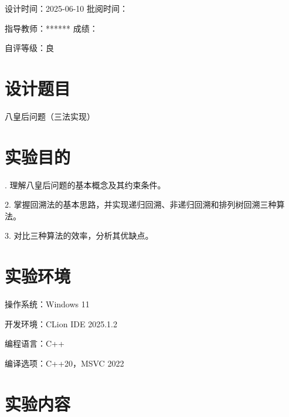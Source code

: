 \documentclass[12pt, a4paper, oneside]{ctexart}
\begin{document}
\begin{flushleft}
\vspace{1em}
\songti\fontsize{18pt}{18pt}\selectfont 设计时间：2025-06-10 \hspace{4em}批阅时间：

\vspace{1em}
\songti\fontsize{18pt}{18pt}\selectfont 指导教师：****** \hspace{7em} 成绩：

\vspace{1em}
\songti\fontsize{18pt}{18pt}\selectfont 自评等级：良
\end{flushleft}

\newpage %

\clearpage
\tableofcontents
\clearpage

\newpage %


\section{设计题目}
\begin{flushleft}
\songti\fontsize{16pt}{16pt}\selectfont
八皇后问题（三法实现）
\end{flushleft}

\section{实验目的}
\begin{flushleft}
\songti\fontsize{16pt}{16pt}.  理解八皇后问题的基本概念及其约束条件。

2.  掌握回溯法的基本思路，并实现递归回溯、非递归回溯和排列树回溯三种算法。

3.  对比三种算法的效率，分析其优缺点。
\end{flushleft}

\section{实验环境}
\begin{flushleft}
\songti\fontsize{16pt}{16pt}\selectfont
操作系统：Windows 11

开发环境：CLion IDE 2025.1.2

编程语言：C++

编译选项：C++20，MSVC 2022
\end{flushleft}

\section{实验内容}
\end{document}

